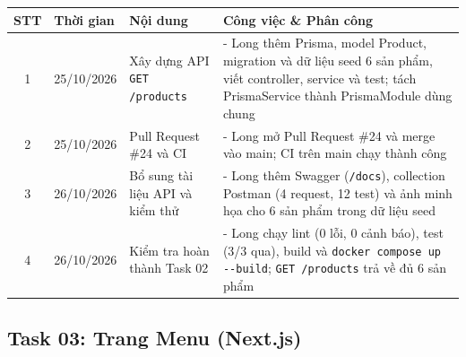 \documentclass[12pt, a4paper]{article}
\begin{document}
\begin{tabularx}{\textwidth}{|c|p{3.2cm}|Y|Y|}
    \hline
    \textbf{STT} &
    \textbf{Thời gian} &
    \textbf{Nội dung} &
    \textbf{Công việc \& Phân công} \\
    \hline

    1 &
    25/10/2026 &
    Xây dựng API \texttt{GET /products} &
    - Long thêm Prisma, model Product, migration và dữ liệu seed 6 sản phẩm, viết controller, service và test; tách PrismaService thành PrismaModule dùng chung \\
    \hline

    2 &
    25/10/2026 &
    Pull Request \#24 và CI &
    - Long mở Pull Request \#24 và merge vào main; CI trên main chạy thành công \\
    \hline

    3 &
    26/10/2026 &
    Bổ sung tài liệu API và kiểm thử &
    - Long thêm Swagger (\texttt{/docs}), collection Postman (4 request, 12 test) và ảnh minh họa cho 6 sản phẩm trong dữ liệu seed \\
    \hline

    4 &
    26/10/2026 &
    Kiểm tra hoàn thành Task 02 &
    - Long chạy lint (0 lỗi, 0 cảnh báo), test (3/3 qua), build và \texttt{docker compose up -{}-build}; \texttt{GET /products} trả về đủ 6 sản phẩm \\
    \hline
\end{tabularx}

\vspace{0.8cm}

\subsection*{Task 03: Trang Menu (Next.js)}
\end{document}
